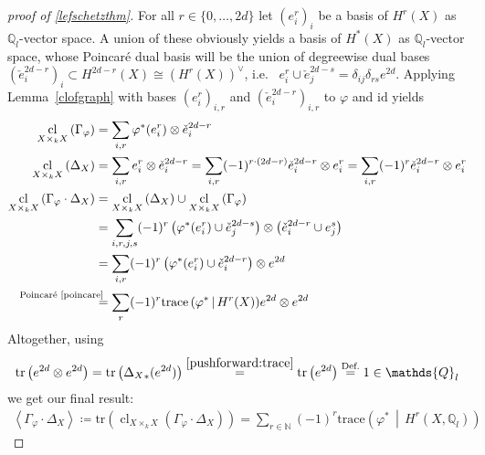 \documentclass[english]{scrartcl}
\theoremstyle{definition}
\theoremstyle{remark}
\newcommand*{\N}{\mathds{N}}
\newcommand*{\Z}{\mathds{Z}}
\newcommand*{\Q}{\mathds{Q}}
\newcommand*{\Zl}{\Z_l} %
\newcommand*{\Ql}{\Q_l} %
\newcommand*{\id}{\text{id}} %
\newcommand*{\idest}{i.e.\ }
\newcommand*{\Tr}{\text{tr}} %
\newcommand*{\tr}[1]{\Tr\left(#1\right)} %
\newcommand*{\intProd}[2]{{#1\cdot#2}} %
\newcommand*{\intNum}[1]{{\left\langle{#1}\right\rangle}} %
\newcommand*{\Graph}[1]{{\Gamma_{#1}}} %
\newcommand*{\Diag}[1]{{\Delta_{#1}}} %
\newcommand*{\trace}[2]{{\text{trace}\left(#1 \,\middle|\, #2 \right)}} %
\DeclareMathOperator{\CL}{cl} %
\newcommand*{\cl}[2]{{\CL_{#1}\left(#2\right)}} %
\renewcommand*{\phi}{\varphi}
\newcommand*{\Poincare}{{\text{Poincaré \ref{poincare}}}}
\begin{document}
\begin{proof}[proof of \autoref{lefschetzthm}]
    For all $r\in\{0,\dotsc,2d\}$ let $(e_i^r)_{i}$ be a basis of
    $H^r(X)$ as $\Ql$-vector space. A union of these obviously yields
    a basis of $H^*(X)$ as $\Ql$-vector space, whose Poincaré dual
    basis will be the union of degreewise dual bases
    $(\check e_i^{2d-r})_{i}\subset H^{2d-r}(X)\cong (H^{r}(X))^\vee$,
    \idest
    $e^r_i\cup \check e_j^{2d-s}=\delta_{ij}\delta_{rs}e^{2d}$.
    Applying Lemma~\ref{clofgraph} with bases $(e_i^r)_{i,r}$ and
    $(\check e_i^{2d-r})_{i,r}$ to $\phi$ and $\id$ yields
    \begin{align*}
      \cl{X\times_k X}{\Graph{\phi}}
      &= \sum_{i,r} \phi^*(e_i^r)\otimes \check e_i^{2d-r}\\
      \cl{X\times_k X}{\Diag{X}}
      &= \sum_{i,r} e_i^r\otimes \check e_i^{2d-r} =
        \sum_{i,r} (-1)^{r\cdot (2d-r)}\check e_i^{2d-r}\otimes e_i^{r} =
        \sum_{i,r} (-1)^{r}\check e_i^{2d-r}\otimes e_i^r\\
      \cl{X\times_k X}{\intProd{\Graph{\phi}}{\Diag{X}}}
      &= \cl{X\times_k X}{\Diag{X}} \cup \cl{X\times_k X}{\Graph{\phi}}\\
      &= \sum_{i,r,j,s} (-1)^{r}
        \left(\phi^*(e_i^r)\cup \check e_j^{2d-s}\right)
        \otimes \left(\check e_i^{2d-r}\cup e_j^s\right)\\
      &= \sum_{i,r} (-1)^{r}
        \left(\phi^*(e_i^r)\cup \check e_i^{2d-r}\right)
        \otimes e^{2d}\\
      &\overset{\mathllap{\Poincare}}=
        \sum_{r} (-1)^r \trace{\phi^*}{H^r(X)} e^{2d} \otimes e^{2d}
    \end{align*}
    Altogether, using
    \begin{align*}
      \tr{e^{2d} \otimes e^{2d}}
      = \tr{\Diag{X}_*(e^{2d})}
      \overset{\ref{pushforward:trace}}= \tr{e^{2d}}
      \overset{\text{Def.}}= 1\in\Ql
    \end{align*}
    we get our final result:
    \begin{gather*}
      \intNum{\intProd{\Graph\phi}{\Diag X}} \coloneqq
      \tr{\cl{X\times_kX}{\intProd{\Graph\phi}{\Diag X}}}
      = \sum_{r\in\N} (-1)^r \trace{\phi^*}{H^r(X,\Ql)}
    \end{gather*}
\end{proof}

\nocite{*}
\printbibliography
\end{document}
